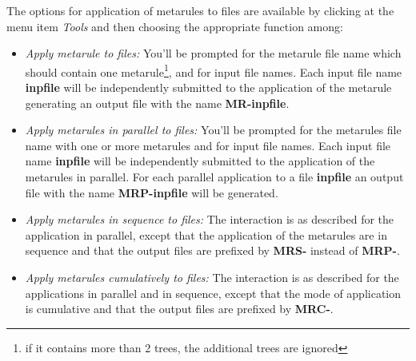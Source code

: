 The options for application of metarules to files are available by clicking
at the menu item {\it Tools} and then choosing the appropriate function
among:

\begin{itemize}
\item   {\it Apply metarule to files:}  
        You'll be prompted for the metarule file name
        which should contain one metarule\footnote{if it contains more than 
        2 trees, the additional trees are ignored}, and for input file names.
        Each input file name {\bf inpfile} will be independently submitted to 
        the application of the metarule generating an output file with the 
        name    {\bf MR-inpfile}.

\item   {\it Apply metarules in parallel to files:}
        You'll be prompted for the metarules file name with one or more 
        metarules and for input file names.
        Each input file name {\bf inpfile} will be independently submitted to 
        the application of the metarules in parallel. For each parallel 
        application to a file {\bf inpfile} an output file with the 
        name    {\bf MRP-inpfile} will be generated.

\item   {\it Apply metarules in sequence to files:}  
        The interaction is as described for the application in parallel, 
        except that
        the application of the metarules are in sequence and that 
        the output files are prefixed by {\bf MRS-} instead of {\bf MRP-}.

\item   {\it Apply metarules cumulatively to files:}  
        The interaction is as described for the applications in parallel
        and in sequence, except that the mode of application is cumulative
        and that the output files are prefixed by {\bf MRC-}.
\end{itemize}


